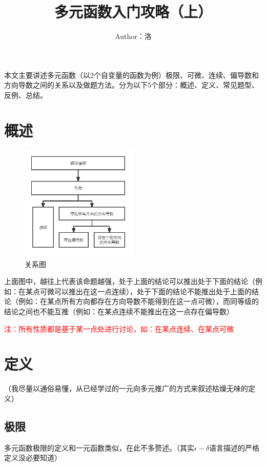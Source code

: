 \documentclass{article}
\title{多元函数入门攻略（上）}
\date{}
\author{Author：洛}
\begin{document}
\maketitle


本文主要讲述多元函数（以2个自变量的函数为例）极限、可微、连续、偏导数和方向导数之间的关系以及做题方法。分为以下5个部分：概述、定义、常见题型、反例、总结。



\tableofcontents

\newpage
\setcounter{page}{1}

\section{概述}
\begin{figure}[!h]
    \centering
    \includegraphics[width=0.5\textwidth]{pic/01.png}
    \caption{关系图}
\end{figure}

上面图中，越往上代表该命题越强，处于上面的结论可以推出处于下面的结论（例如：在某点可微可以推出在这一点连续），处于下面的结论不能推出处于上面的结论（例如：在某点所有方向都存在方向导数不能得到在这一点可微），而同等级的结论之间也不能互推（例如：在某点连续不能推出在这一点存在偏导数）

\textcolor{red}{注：所有性质都是基于某一点处进行讨论，如：在某点连续、在某点可微}


\section{定义}
（我尽量以通俗易懂，从已经学过的一元向多元推广的方式来叙述枯燥无味的定义）

\subsection{极限}
多元函数极限的定义和一元函数类似，在此不多赘述。（其实$\epsilon-\delta$语言描述的严格定义没必要知道）
\end{document}
